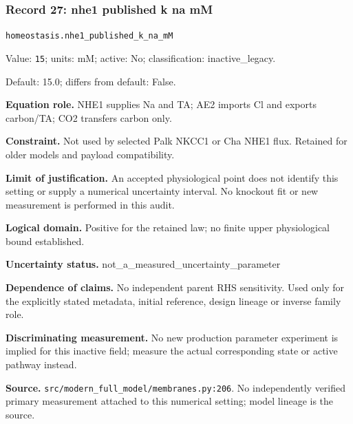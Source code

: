 \subsubsection*{Record 27: nhe1 published k na mM}
{\small \nolinkurl{homeostasis.nhe1_published_k_na_mM}\par

Value: \texttt{15}; units: mM; active: No; classification: inactive\_legacy.\par

Default: 15.0; differs from default: False.\par

\textbf{Equation role.} NHE1 supplies Na and TA; AE2 imports Cl and exports carbon/TA; CO2 transfers carbon only.\par

\textbf{Constraint.} Not used by selected Palk NKCC1 or Cha NHE1 flux. Retained for older models and payload compatibility.\par

\textbf{Limit of justification.} An accepted physiological point does not identify this setting or supply a numerical uncertainty interval. No knockout fit or new measurement is performed in this audit.\par

\textbf{Logical domain.} Positive for the retained law; no finite upper physiological bound established.\par

\textbf{Uncertainty status.} not\_a\_measured\_uncertainty\_parameter\par

\textbf{Dependence of claims.} No independent parent RHS sensitivity. Used only for the explicitly stated metadata, initial reference, design lineage or inverse family role.\par

\textbf{Discriminating measurement.} No new production parameter experiment is implied for this inactive field; measure the actual corresponding state or active pathway instead.\par

\textbf{Source.} \nolinkurl{src/modern_full_model/membranes.py:206}. No independently verified primary measurement attached to this numerical setting; model lineage is the source.\par}

